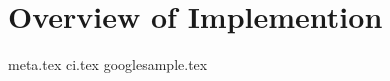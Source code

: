 \chapter{Overview of Implemention}\label{cha:initial_development}\label{cha:overview_of_implementation}
{meta.tex}
{ci.tex}
{googlesample.tex}
